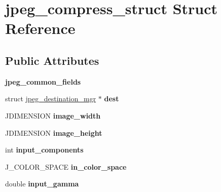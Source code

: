 \hypertarget{structjpeg__compress__struct}{}\section{jpeg\+\_\+compress\+\_\+struct Struct Reference}
\label{structjpeg__compress__struct}
\subsection*{Public Attributes}
\begin{DoxyCompactItemize}
\item 
{\bfseries jpeg\+\_\+common\+\_\+fields}\hypertarget{structjpeg__compress__struct_a831013770bec36f77dd2048c8771513c}{}\label{structjpeg__compress__struct_a831013770bec36f77dd2048c8771513c}

\item 
struct \hyperlink{structjpeg__destination__mgr}{jpeg\+\_\+destination\+\_\+mgr} $\ast$ {\bfseries dest}\hypertarget{structjpeg__compress__struct_ab31c2c756e309dee8d0318557353ba40}{}\label{structjpeg__compress__struct_ab31c2c756e309dee8d0318557353ba40}

\item 
J\+D\+I\+M\+E\+N\+S\+I\+ON {\bfseries image\+\_\+width}\hypertarget{structjpeg__compress__struct_ac8e50a2c70252c53f3e10b886818f2cf}{}\label{structjpeg__compress__struct_ac8e50a2c70252c53f3e10b886818f2cf}

\item 
J\+D\+I\+M\+E\+N\+S\+I\+ON {\bfseries image\+\_\+height}\hypertarget{structjpeg__compress__struct_a30863835e7785b7df800811f842b2da0}{}\label{structjpeg__compress__struct_a30863835e7785b7df800811f842b2da0}

\item 
int {\bfseries input\+\_\+components}\hypertarget{structjpeg__compress__struct_af5b66b039ea5a96bb2f5cf0254115837}{}\label{structjpeg__compress__struct_af5b66b039ea5a96bb2f5cf0254115837}

\item 
J\+\_\+\+C\+O\+L\+O\+R\+\_\+\+S\+P\+A\+CE {\bfseries in\+\_\+color\+\_\+space}\hypertarget{structjpeg__compress__struct_ac27d1dfbbbd677aab9fb570c58ca960d}{}\label{structjpeg__compress__struct_ac27d1dfbbbd677aab9fb570c58ca960d}

\item 
double {\bfseries input\+\_\+gamma}\hypertarget{structjpeg__compress__struct_ac5d2e16382ea12fb4e3bd6a69f7831ea}{}\label{structjpeg__compress__struct_ac5d2e16382ea12fb4e3bd6a69f7831ea}


\end{DoxyCompactItemize}
